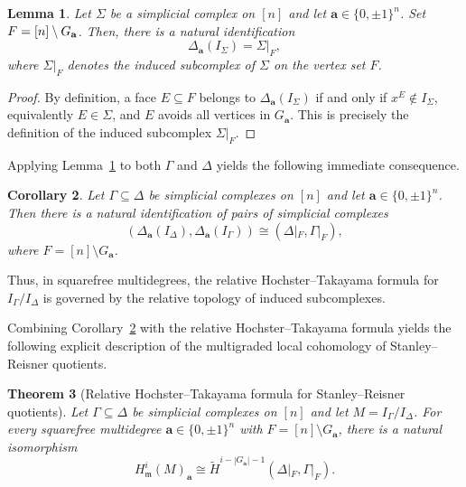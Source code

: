 \documentclass[12pt]{amsart}
\numberwithin{equation}{section}
\newtheorem{theorem}{Theorem}[section]
\newtheorem{corollary}[theorem]{Corollary}
\newtheorem{lemma}[theorem]{Lemma}
\theoremstyle{definition}
\theoremstyle{definition}
\def\a{{\bold a}}
\begin{document}
	\begin{lemma}
	\label{lem:SR-Takayama-induced}
	Let $\Sigma$ be a simplicial complex on $[n]$ and let $\mathbf a\in\{0,\pm 1\}^n$. Set $F = [n] \setminus G_\a$. Then, there is a natural identification
	\[
	\Delta_{\mathbf a}(I_\Sigma)=\Sigma|_F,
	\]
	where $\Sigma|_F$ denotes the induced subcomplex of $\Sigma$ on the vertex set $F$.
\end{lemma}

\begin{proof}
	By definition, a face $E\subseteq F$ belongs to $\Delta_{\mathbf a}(I_\Sigma)$ if and only if
	$x^E\notin I_\Sigma$, equivalently $E\in\Sigma$, and $E$ avoids all vertices in $G_{\mathbf a}$.
	This is precisely the definition of the induced subcomplex $\Sigma|_F$.
\end{proof}

Applying Lemma~\ref{lem:SR-Takayama-induced} to both $\Gamma$ and $\Delta$ yields the
following immediate consequence.

\begin{corollary}
	\label{cor:SR-relative-induced}
	Let $\Gamma\subseteq\Delta$ be simplicial complexes on $[n]$ and let $\mathbf a\in\{0,\pm 1\}^n$.
	Then there is a natural identification of pairs of simplicial complexes
	\[
	\left(\Delta_{\mathbf a}(I_\Delta), \Delta_{\mathbf a}(I_\Gamma)\right)
	\cong
	\left(\Delta|_F, \Gamma|_F\right),
	\]
	where $F=[n]\setminus G_{\mathbf a}$.
\end{corollary}

Thus, in squarefree multidegrees, the relative Hochster--Takayama formula for
$I_\Gamma/I_\Delta$ is governed by the relative topology of induced subcomplexes.


Combining Corollary~\ref{cor:SR-relative-induced} with the relative Hochster--Takayama
formula yields the following explicit description of the multigraded local cohomology
of Stanley--Reisner quotients.

\begin{theorem}[Relative Hochster--Takayama formula for Stanley--Reisner quotients]
	\label{thm:SR-relative-HT}
	Let $\Gamma\subseteq\Delta$ be simplicial complexes on $[n]$ and let
	$M=I_\Gamma/I_\Delta$.
	For every squarefree multidegree $\mathbf a\in\{0,\pm 1\}^n$ with $F=[n]\setminus G_{\mathbf a}$,
	there is a natural isomorphism
	\[
	H^i_{\mathfrak m}(M)_{\mathbf a}
	\cong
	\widetilde H^{i-|G_{\mathbf a}|-1}\left(\Delta|_F, \Gamma|_F\right).
	\]
\end{theorem}
\end{document}
